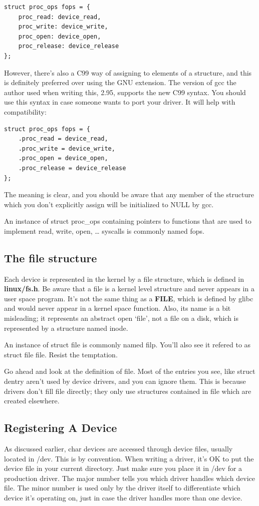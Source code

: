\documentclass[11pt]{article}
\begin{document}
\begin{verbatim}
struct proc_ops fops = {
	proc_read: device_read,
	proc_write: device_write,
	proc_open: device_open,
	proc_release: device_release
};
\end{verbatim}

However, there's also a C99 way of assigning to elements of a structure, and this is definitely preferred over using the GNU extension. The version of gcc the author used when writing this, 2.95, supports the new C99 syntax. You should use this syntax in case someone wants to port your driver. It will help with compatibility:

\begin{verbatim}
struct proc_ops fops = {
	.proc_read = device_read,
	.proc_write = device_write,
	.proc_open = device_open,
	.proc_release = device_release
};
\end{verbatim}

The meaning is clear, and you should be aware that any member of the structure which you don't explicitly assign will be initialized to NULL by gcc.

An instance of struct proc\_ops containing pointers to functions that are used to implement read, write, open, \ldots{} syscalls is commonly named fops.

\subsection{The file structure}
\label{sec:org8eca273}

Each device is represented in the kernel by a file structure, which is defined in \textbf{linux/fs.h}. Be aware that a file is a kernel level structure and never appears in a user space program. It's not the same thing as a \textbf{FILE}, which is defined by glibc and would never appear in a kernel space function. Also, its name is a bit misleading; it represents an abstract open `file', not a file on a disk, which is represented by a structure named inode.

An instance of struct file is commonly named filp. You'll also see it refered to as struct file file. Resist the temptation.

Go ahead and look at the definition of file. Most of the entries you see, like struct dentry aren't used by device drivers, and you can ignore them. This is because drivers don't fill file directly; they only use structures contained in file which are created elsewhere.

\subsection{Registering A Device}
\label{sec:org64e0a84}
As discussed earlier, char devices are accessed through device files, usually located in /dev. This is by convention. When writing a driver, it's OK to put the device file in your current directory. Just make sure you place it in /dev for a production driver. The major number tells you which driver handles which device file. The minor number is used only by the driver itself to differentiate which device it's operating on, just in case the driver handles more than one device.
\end{document}
